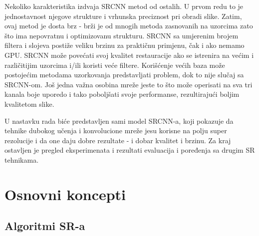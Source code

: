 \documentclass[12pt]{report}
\numberwithin{equation}{section}
\begin{document}
Nekoliko karakteristika izdvaja SRCNN metod od ostalih. U prvom redu to je jednostavnost njegove strukture i vrhunska preciznost pri obradi slike. Zatim, ovaj metod je dosta brz - brži je od mnogih metoda zasnovanih na uzorcima zato što ima nepovratnu i optimizovanu strukturu. SRCNN sa umjerenim brojem filtera i slojeva postiže veliku brzinu za praktičnu primjenu, čak i ako nemamo GPU. SRCNN može povećati svoj kvalitet restauracije ako se istrenira na većim i različitijim uzorcima i/ili koristi veće filtere. Korišćenje većih baza može postojećim metodama uzorkovanja predstavljati problem, dok to nije slučaj sa SRCNN-om. Još jedna važna osobina mreže jeste to što može operisati na sva tri kanala boje uporedo i tako poboljšati svoje performanse, rezultirajući boljim kvalitetom slike. 

U nastavku rada biće predstavljen sami model SRCNN-a, koji pokazuje da tehnike dubokog učenja i  konvolucione mreže jesu korisne na polju super rezolucije i da one daju dobre rezultate - i dobar kvalitet i brzinu. Za kraj ostavljen je pregled eksperimenata i rezultati evaluacija i poređenja sa drugim SR tehnikama. 


\chapter{Osnovni koncepti}\label{ch2}

\section{Algoritmi SR-a}

\end{document}
